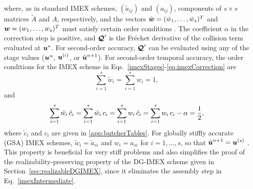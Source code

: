 where, as in standard IMEX schemes, $(\tilde{a}_{ij})$ and $(a_{ij})$, components of $s\times s$ matrices $\tilde{A}$ and $A$, respectively, and the vectors $\tilde{\boldsymbol{w}}=(\tilde{w}_{1},\ldots,\tilde{w}_{s})^{T}$ and $\boldsymbol{w}=(w_{1},\ldots,w_{s})^{T}$ must satisfy certain order conditions \cite{pareschiRusso_2005}.  
The coefficient $\alpha$ in the correction step is positive, and $\boldsymbol{\mathcal{Q}}'$ is the Fr{\'e}chet derivative of the collision term evaluated at $\boldsymbol{u}^{*}$.  
For second-order accuracy, $\boldsymbol{\mathcal{Q}}'$ can be evaluated using any of the stage values ($\boldsymbol{u}^{n}$, $\boldsymbol{u}^{(i)}$, or $\tilde{\boldsymbol{u}}^{n+1}$).  
For second-order temporal accuracy, the order conditions for the IMEX scheme in Eqs.~\eqref{imexStages}-\eqref{eq:imexCorrection} are \cite{hu_etal_2018}
\begin{equation}
  \sum_{i=1}^{s}\tilde{w}_{i}=\sum_{i=1}^{s}w_{i}=1,
  \label{orderConditions1}
\end{equation}
and
\begin{equation}
  \sum_{i=1}^{s}\tilde{w}_{i}\,\tilde{c}_{i}
  =\sum_{i=1}^{s}\tilde{w}_{i}\,c_{i}
  =\sum_{i=1}^{s}w_{i}\,\tilde{c}_{i}
  =\sum_{i=1}^{s}w_{i}\,c_{i}-\alpha=\frac{1}{2}, 
  \label{orderConditions2}
\end{equation}
where $\tilde{c}_{i}$ and $c_{i}$ are given in \ref{app:butcherTables}.  
For globally stiffly accurate (GSA) IMEX schemes, $\tilde{w}_{i}=\tilde{a}_{si}$ and $w_{i}=a_{si}$ for $i=1,\ldots,s$, so that $\tilde{\boldsymbol{u}}^{n+1}=\boldsymbol{u}^{(s)}$ \cite{ascher_etal_1997}.  
This property is beneficial for very stiff problems and also simplifies the proof of the realizability-preserving property of the DG-IMEX scheme given in Section~\ref{sec:realizableDGIMEX}, since it eliminates the assembly step in Eq.~\eqref{imexIntermediate}.  

